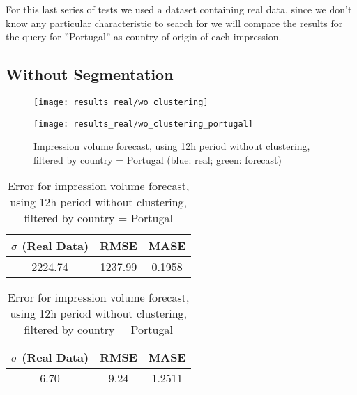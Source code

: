 For this last series of tests we used a dataset containing real data, since we
don't know any particular characteristic to search for we will compare the
results for the query for ''Portugal'' as country of origin of each impression.

\subsection*{Without Segmentation}

\begin{figure}[!ht]
\centering
\begin{minipage}[t]{0.45\linewidth}
\texttt{[image: results\_real/wo\_clustering]}
\caption[Volume
impression forecast, real data]{Impression volume
forecast, using 12h period without clustering (blue: real; green: forecast)}
\label{fig:vol_real_data_wo_clustering}
\end{minipage}
\quad
\begin{minipage}[t]{0.45\linewidth}
\texttt{[image: results\_real/wo\_clustering\_portugal]} \caption[Volume
impression forecast, real data, Portugal]{Impression volume
forecast, using 12h period without clustering, filtered by country = Portugal (blue: real; green: forecast)}
\label{fig:vol_real_data_wo_clustering_filtered}
\end{minipage}

\end{figure}

\begin{table}[!ht]
\centering
\footnotesize
\begin{minipage}[t]{0.45\linewidth}
\centering
\footnotesize
\begin{tabular}{ccc}
 $\sigma$ (Real Data) & RMSE & MASE   \\ \hline
2224.74 & 1237.99 & 0.1958 \\
\end{tabular}

\vspace{0.5cm}

\caption[Volume
impression forecast, real data, without clustering]{Error for impression volume
forecast, using 12h period without clustering}
\label{tab:err_real_data_wo_clustering}
\end{minipage}
\quad
\begin{minipage}[t]{0.45\linewidth}
\centering
\footnotesize
\begin{tabular}{ccc}
 $\sigma$ (Real Data) & RMSE & MASE   \\ \hline
6.70 & 9.24 & 1.2511 \\
\end{tabular}

\vspace{0.5cm}

\caption[Volume
impression forecast, safari]{Error for impression volume
forecast, using 12h period without clustering, filtered by country = Portugal}
\label{tab:err_real_data_wo_clustering_filtered}
\end{minipage}

\end{table}

